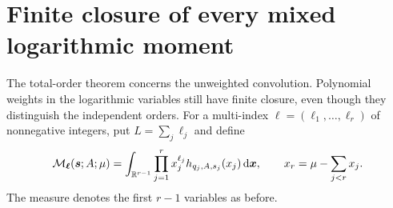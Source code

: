 \section{Finite closure of every mixed logarithmic moment}
\label{clc:sec:moments}

The total-order theorem concerns the unweighted convolution. Polynomial
weights in the logarithmic variables still have finite closure, even
though they distinguish the independent orders.
For a multi-index $\boldsymbol\ell=(\ell_1,\ldots,\ell_r)$ of
nonnegative integers, put $L=\sum_j\ell_j$ and define
\begin{equation}\label{clc:eq:M}
 \mathcal M_{\boldsymbol\ell}(\boldsymbol s;A;\mu)=
 \int_{\mathbb R^{r-1}}\prod_{j=1}^r
      x_j^{\ell_j}h_{q_j,A,s_j}(x_j)\,\mathrm d\boldsymbol x,
 \qquad x_r=\mu-\sum_{j<r}x_j.
\end{equation}
The measure denotes the first $r-1$ variables as before.

